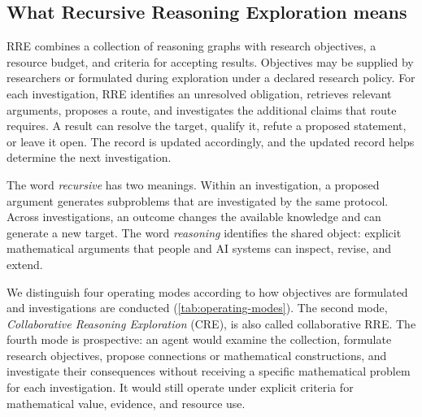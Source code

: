 \subsection{What Recursive Reasoning Exploration means}

RRE combines a collection of reasoning graphs with research objectives, a resource budget, and criteria for accepting results. Objectives may be supplied by researchers or formulated during exploration under a declared research policy. For each investigation, RRE identifies an unresolved obligation, retrieves relevant arguments, proposes a route, and investigates the additional claims that route requires. A result can resolve the target, qualify it, refute a proposed statement, or leave it open. The record is updated accordingly, and the updated record helps determine the next investigation.

The word \emph{recursive} has two meanings. Within an investigation, a proposed argument generates subproblems that are investigated by the same protocol. Across investigations, an outcome changes the available knowledge and can generate a new target. The word \emph{reasoning} identifies the shared object: explicit mathematical arguments that people and AI systems can inspect, revise, and extend.

We distinguish four operating modes according to how objectives are formulated and investigations are conducted (\cref{tab:operating-modes}). The second mode, \emph{Collaborative Reasoning Exploration} (CRE), is also called collaborative RRE. The fourth mode is prospective: an agent would examine the collection, formulate research objectives, propose connections or mathematical constructions, and investigate their consequences without receiving a specific mathematical problem for each investigation. It would still operate under explicit criteria for mathematical value, evidence, and resource use.

